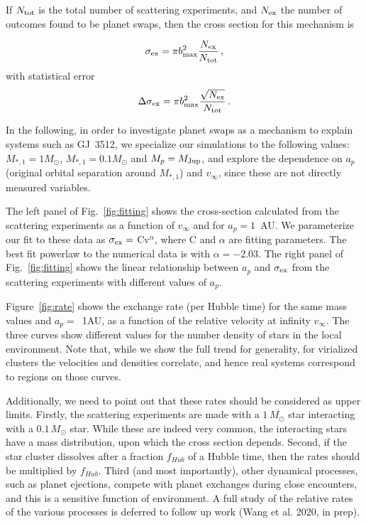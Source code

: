 \documentclass[twocolumn]{aastex62}
\begin{document}
If $N_{\rm tot}$ is the total number of scattering experiments, and $N_{\rm ex}$ the number of outcomes found to be planet swaps, then the cross section for this mechanism is \citep[e.g.][]{hut83}

\begin{equation}
\sigma_{\rm ex} = \pi b_{\rm max}^2\frac{N_{\rm ex}}{N_{\rm tot}}\,,
\end{equation}
with statistical error
\begin{equation}
\Delta\sigma_{\rm ex} = \pi b_{\rm max}^2\frac{\sqrt{N_{\rm ex}}}{N_{\rm tot}}\,.
\end{equation}


In the following, in order to investigate planet swaps as a mechanism to explain systems 
such as GJ~3512, we specialize 
our simulations to the following values:  $M_{*,1}=1M_\odot$, $M_{*,1}=0.1M_\odot$ and $M_p=M_{\rm Jup}$, and explore the dependence on $a_p$ (original orbital separation around $M_{*,1}$) and $v_\infty$, since these are not directly measured variables.

The left panel of Fig.~\ref{fig:fitting} shows the cross-section calculated from the scattering experiments as a function of $v_\infty$ and for $a_p=1$~AU.  We parameterize our fit to these data as $\sigma_{\rm ex} =$ Cv$^{\alpha}$, where C and $\alpha$ are fitting parameters.  The best fit powerlaw to the numerical data is with $\alpha=-2.03$.  The right panel of Fig.~\ref{fig:fitting} shows the linear relationship between $a_p$ and $\sigma_{\rm ex}$ from the scattering experiments with different values of $a_p$. 


Figure~\ref{fig:rate} shows the
exchange rate (per Hubble time) for the same mass values and $a_p=$~1AU, as a function of the 
relative velocity at infinity $v_\infty$. The three curves show different values for the number density of stars in the local environment. Note that, while we show the full trend for generality, for virialized clusters the velocities and densities correlate, and hence real systems correspond to regions on those curves. 

Additionally, we need to point out that these rates 
should be considered as upper limits. Firstly, the scattering experiments are made with a $1\,M_\odot$ star interacting with a $0.1\,M_\odot$ star.
While these are indeed very common, the interacting stars have a mass distribution, upon which the cross section depends.
Second, if the star cluster dissolves after a fraction $f_{Hub}$ of a Hubble time, then the rates should be multiplied by $f_{Hub}$. Third (and most importantly), 
other dynamical processes, such as planet ejections, compete with planet exchanges during close encounters, and this is a sensitive function of environment.  
A full study of the relative rates of the various processes is deferred to follow up work (Wang et al. 2020, in prep).
\end{document}

